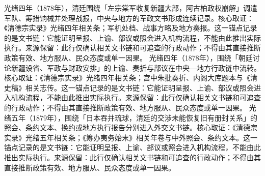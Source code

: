 光绪四年（1878年），清廷围绕「左宗棠军收复新疆大部，阿古柏政权崩解」调遣军队、筹措饷械并处理战报，中央与地方的军政文书形成连续记录。核心取证：《清德宗实录》光绪四年相关条；军机处档、战事方略及地方奏报。这一锚点记录的是文书链：它能证明呈报、上谕、部议或照会进入机构流程，不能由此推出实际执行。来源保留：此行仅确认相关文书链和可追查的行政动作；不得由其直接推断政策有效、地方服从、民众态度或单一因果。
光绪四年（1878年），围绕「朝廷讨论新疆设省、军政与财政安排」的上谕、奏折与部议在中央—地方行政链中流转。核心取证：《清德宗实录》光绪四年相关条；宫中朱批奏折、内阁大库题本与《清史稿》相关志传。这一锚点记录的是文书链：它能证明呈报、上谕、部议或照会进入机构流程，不能由此推出实际执行。来源保留：此行仅确认相关文书链和可追查的行政动作；不得由其直接推断政策有效、地方服从、民众态度或单一因果。
光绪五年（1879年），围绕「日本吞并琉球，清廷的交涉未能恢复旧有册封关系」的照会、条约文本、换约或地方执行报告分别进入外交文书链。核心取证：《清德宗实录》光绪五年相关条；《筹办夷务始末》相关年卷与中外照会、条约文本。这一锚点记录的是文书链：它能证明呈报、上谕、部议或照会进入机构流程，不能由此推出实际执行。来源保留：此行仅确认相关文书链和可追查的行政动作；不得由其直接推断政策有效、地方服从、民众态度或单一因果。
